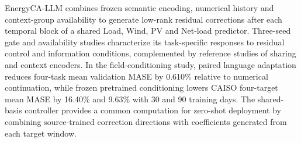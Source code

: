\documentclass[journal]{IEEEtran}
\begin{document}
EnergyCA-LLM combines frozen semantic encoding, numerical history and context-group availability to generate low-rank residual corrections after each temporal block of a shared Load, Wind, PV and Net-load predictor. Three-seed gate and availability studies characterize its task-specific responses to residual control and information conditions, complemented by reference studies of sharing and context encoders. In the field-conditioning study, paired language adaptation reduces four-task mean validation MASE by 0.610\% relative to numerical continuation, while frozen pretrained conditioning lowers CAISO four-target mean MASE by 16.40\% and 9.63\% with 30 and 90 training days. The shared-basis controller provides a common computation for zero-shot deployment by combining source-trained correction directions with coefficients generated from each target window.

\clearpage
{}


\end{document}
